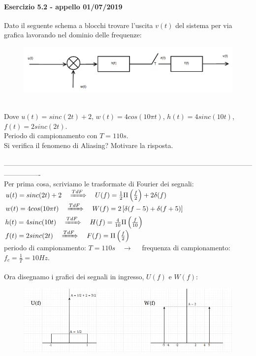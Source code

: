 \documentclass[12pt,a4paper]{article}
\begin{document}
	\paragraph{Esercizio 5.2 - appello 01/07/2019}
	Dato il seguente schema a blocchi trovare l’uscita $v(t)$ del sistema per via grafica lavorando nel dominio delle frequenze:
	\begin{figure}[h!]
		\centering
		\includegraphics[scale=0.4]{./images/fourier21.png}
	\end{figure}
	\\Dove $u(t) = sinc(2t) + 2$, $w(t) = 4cos(10\pi t)$, $h(t) = 4sinc(10t)$, $f(t) = 2sinc(2t)$. \\Periodo di campionamento con $T=110s$.\\Si verifica il fenomeno di Aliasing? Motivare la risposta.
	\\\\
----------------------------------------------------------------------------------------------------------------------------\\
	Per prima cosa, scriviamo le trasformate di Fourier dei segnali:\\
	$u(t) = sinc(2t) + 2\quad\xRightarrow[]{TdF}\quad U(f) = \frac{1}{2}\Pi\left(\frac{f}{2}\right) + 2\delta(f)$\\
	$w(t) = 4cos(10\pi t)\quad\xRightarrow[]{TdF}\quad W(f) = 2\left[\delta(f-5) + \delta(f+5)\right]$\\
	$h(t) = 4sinc(10t)\quad\xRightarrow[]{TdF}\quad H(f) = \frac{4}{10}\Pi\left(\frac{f}{10}\right)$\\
	$f(t) = 2sinc(2t)\quad\xRightarrow[]{TdF}\quad F(f) = \Pi\left(\frac{f}{2}\right)$\vspace{5px}\\
	periodo di campionamento: $T=110s\quad\rightarrow\quad$ frequenza di campionamento: $f_c = \frac{1}{T} = 10Hz$.\\\\
	Ora disegnamo i grafici dei segnali in ingresso, $U(f)$ e $W(f)$:
	\begin{figure}[h!]
		\centering
		\includegraphics[scale=0.4]{./images/fourier22.png}
	\end{figure}
\end{document}
